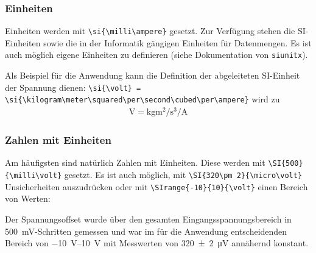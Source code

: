 				\noindent{}
	
			\subsubsection{Einheiten}
				Einheiten werden mit \lstinline|\si{\milli\ampere}| gesetzt.
				Zur Verfügung stehen die SI-Einheiten sowie die in der Informatik gängigen Einheiten für Datenmengen.
				Es ist auch möglich eigene Einheiten zu definieren (siehe Dokumentation von \lstinline|siunitx|).
				
				\begin{vorlagenbeispiel}
					Als Beispiel für die Anwendung kann die Definition der abgeleiteten SI-Einheit der Spannung dienen: \lstinline|\si{\volt} = \si{\kilogram\meter\squared\per\second\cubed\per\ampere}| wird zu
					\begin{align}
						\si{\volt} = \si{\kilogram\meter\squared\per\second\cubed\per\ampere}
					\end{align}
				\end{vorlagenbeispiel}
				
			\subsubsection{Zahlen mit Einheiten}
				Am häufigsten sind natürlich Zahlen mit Einheiten.
				Diese werden mit \lstinline|\SI{500}{\milli\volt}| gesetzt. Es ist auch möglich, mit \lstinline|\SI{320\pm 2}{\micro\volt}| Unsicherheiten auszudrücken oder mit \lstinline|\SIrange{-10}{10}{\volt}| einen Bereich von Werten:
%				
				\begin{vorlagenbeispiel}
					Der Spannungsoffset wurde über den gesamten Eingangsspannungsbereich in  \SI{500}{\milli\volt}-Schritten gemessen und war im für die Anwendung entscheidenden Bereich von \SIrange{-10}{10}{\volt} mit Messwerten von \SI{320\pm2}{\micro\volt} annähernd konstant.
				\end{vorlagenbeispiel}
		
